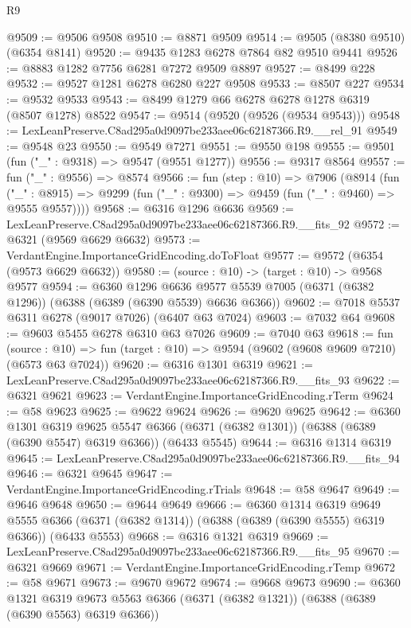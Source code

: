 \begin{lexlean}{R9}
\begin{coremodule}
@9509 := @9506 @9508
@9510 := @8871 @9509
@9514 := @9505 (@8380 @9510) (@6354 @8141)
@9520 := @9435 @1283 @6278 @7864 @82 @9510 @9441
@9526 := @8883 @1282 @7756 @6281 @7272 @9509 @8897
@9527 := @8499 @228
@9532 := @9527 @1281 @6278 @6280 @227 @9508
@9533 := @8507 @227
@9534 := @9532 @9533
@9543 := @8499 @1279 @66 @6278 @6278 @1278 @6319 (@8507 @1278) @8522
@9547 := @9514 (@9520 (@9526 (@9534 @9543)))
@9548 := LexLeanPreserve.C8ad295a0d9097be233aee06c62187366.R9.__rel_91
@9549 := @9548 @23
@9550 := @9549 @7271
@9551 := @9550 @198
@9555 := @9501 (fun ("_" : @9318) => @9547 (@9551 @1277))
@9556 := @9317 @8564
@9557 := fun ("_" : @9556) => @8574
@9566 := fun (step : @10) =>
  @7906
    (@8914
      (fun ("_" : @8915) => @9299 (fun ("_" : @9300) => @9459 (fun ("_" : @9460) => @9555 @9557))))
@9568 := @6316 @1296 @6636
@9569 := LexLeanPreserve.C8ad295a0d9097be233aee06c62187366.R9.__fits_92
@9572 := @6321 (@9569 @6629 @6632)
@9573 := VerdantEngine.ImportanceGridEncoding.doToFloat
@9577 := @9572 (@6354 (@9573 @6629 @6632))
@9580 := (source : @10) -> (target : @10) -> @9568 @9577
@9594 := @6360
    @1296
    @6636
    @9577
    @5539
    @7005
    (@6371 (@6382 @1296))
    (@6388 (@6389 (@6390 @5539) @6636 @6366))
@9602 := @7018 @5537 @6311 @6278 (@9017 @7026) (@6407 @63 @7024)
@9603 := @7032 @64
@9608 := @9603 @5455 @6278 @6310 @63 @7026
@9609 := @7040 @63
@9618 := fun (source : @10) =>
  fun (target : @10) => @9594 (@9602 (@9608 @9609 @7210) (@6573 @63 @7024))
@9620 := @6316 @1301 @6319
@9621 := LexLeanPreserve.C8ad295a0d9097be233aee06c62187366.R9.__fits_93
@9622 := @6321 @9621
@9623 := VerdantEngine.ImportanceGridEncoding.rTerm
@9624 := @58 @9623
@9625 := @9622 @9624
@9626 := @9620 @9625
@9642 := @6360
    @1301
    @6319
    @9625
    @5547
    @6366
    (@6371 (@6382 @1301))
    (@6388 (@6389 (@6390 @5547) @6319 @6366))
    (@6433 @5545)
@9644 := @6316 @1314 @6319
@9645 := LexLeanPreserve.C8ad295a0d9097be233aee06c62187366.R9.__fits_94
@9646 := @6321 @9645
@9647 := VerdantEngine.ImportanceGridEncoding.rTrials
@9648 := @58 @9647
@9649 := @9646 @9648
@9650 := @9644 @9649
@9666 := @6360
    @1314
    @6319
    @9649
    @5555
    @6366
    (@6371 (@6382 @1314))
    (@6388 (@6389 (@6390 @5555) @6319 @6366))
    (@6433 @5553)
@9668 := @6316 @1321 @6319
@9669 := LexLeanPreserve.C8ad295a0d9097be233aee06c62187366.R9.__fits_95
@9670 := @6321 @9669
@9671 := VerdantEngine.ImportanceGridEncoding.rTemp
@9672 := @58 @9671
@9673 := @9670 @9672
@9674 := @9668 @9673
@9690 := @6360
    @1321
    @6319
    @9673
    @5563
    @6366
    (@6371 (@6382 @1321))
    (@6388 (@6389 (@6390 @5563) @6319 @6366))

\end{coremodule}
\end{lexlean}
